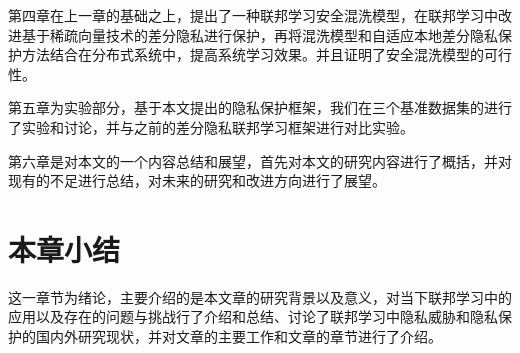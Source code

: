 第四章在上一章的基础之上，提出了一种联邦学习安全混洗模型，在联邦学习中改进基于稀疏向量技术的差分隐私进行保护，再将混洗模型和自适应本地差分隐私保护方法结合在分布式系统中，提高系统学习效果。并且证明了安全混洗模型的可行性。
    
第五章为实验部分，基于本文提出的隐私保护框架，我们在三个基准数据集的进行了实验和讨论，并与之前的差分隐私联邦学习框架进行对比实验。

第六章是对本文的一个内容总结和展望，首先对本文的研究内容进行了概括，并对现有的不足进行总结，对未来的研究和改进方向进行了展望。

\section{本章小结}
这一章节为绪论，主要介绍的是本文章的研究背景以及意义，对当下联邦学习中的应用以及存在的问题与挑战行了介绍和总结、讨论了联邦学习中隐私威胁和隐私保护的国内外研究现状，并对文章的主要工作和文章的章节进行了介绍。

